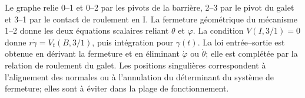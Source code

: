 \begin{corrigebox}
Le graphe relie 0--1 et 0--2 par les pivots de la barrière, 2--3 par
                le pivot du galet et 3--1 par le contact de roulement en I.
La fermeture géométrique du mécanisme 1--2 donne les deux équations
                scalaires reliant $\theta$ et $\varphi$.
La condition $V(I,3/1)=0$ donne
                $r\dot\gamma=V_t(B,3/1)$, puis intégration pour $\gamma(t)$.
La loi entrée--sortie est obtenue en dérivant la fermeture et en
                éliminant $\dot\varphi$ ou $\dot\theta$; elle est complétée par la relation
                de roulement du galet.
Les positions singulières correspondent à l'alignement des normales
                ou à l'annulation du déterminant du système de fermeture; elles sont à
                éviter dans la plage de fonctionnement.
\end{corrigebox}
